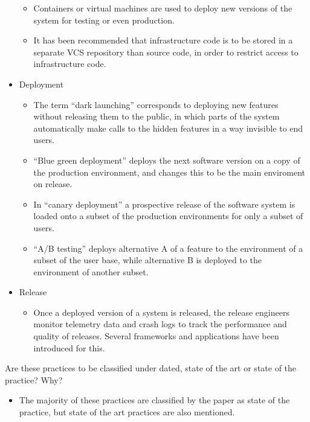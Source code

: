 \documentclass[]{book}
\providecommand{\tightlist}{%
  \setlength{\itemsep}{0pt}\setlength{\parskip}{0pt}}
\begin{document}
\begin{itemize}
  \begin{itemize}
  \tightlist
  \item
    Containers or virtual machines are used to deploy new versions of
    the system for testing or even production.
  \item
    It has been recommended that infrastructure code is to be stored in
    a separate VCS repository than source code, in order to restrict
    access to infrastructure code.
  \end{itemize}
\item
  Deployment

  \begin{itemize}
  \tightlist
  \item
    The term ``dark launching'' corresponds to deploying new features
    without releasing them to the public, in which parts of the system
    automatically make calls to the hidden features in a way invisible
    to end users.
  \item
    ``Blue green deployment'' deploys the next software version on a
    copy of the production environment, and changes this to be the main
    enviroment on release.
  \item
    In ``canary deployment'' a prospective release of the software
    system is loaded onto a subset of the production environments for
    only a subset of users.
  \item
    ``A/B testing'' deploys alternative A of a feature to the
    environment of a subset of the user base, while alternative B is
    deployed to the environment of another subset.
  \end{itemize}
\item
  Release

  \begin{itemize}
  \tightlist
  \item
    Once a deployed version of a system is released, the release
    engineers monitor telemetry data and crash logs to track the
    performance and quality of releases. Several frameworks and
    applications have been introduced for this.
  \end{itemize}
\end{itemize}

Are these practices to be classified under dated, state of the art or
state of the practice? Why?

\begin{itemize}
\tightlist
\item
  The majority of these practices are classified by the paper as state
  of the practice, but state of the art practices are also mentioned.
\end{itemize}
\end{document}
